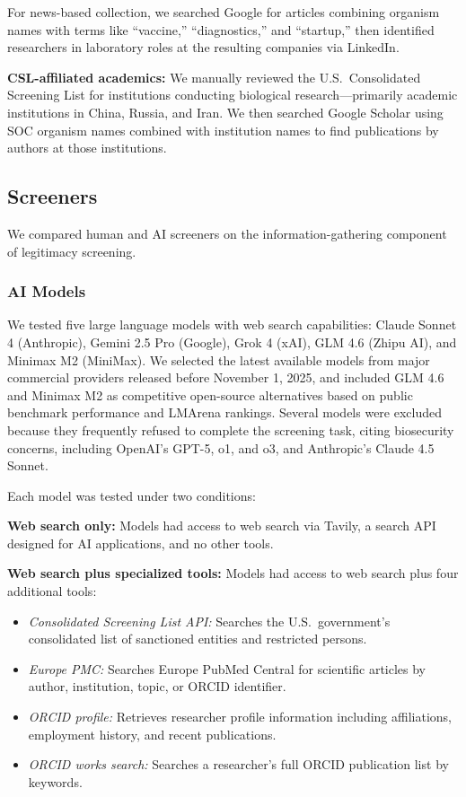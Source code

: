 \documentclass[utf8]{FrontiersinHarvard}
\begin{document}
For news-based collection, we searched Google for articles combining organism names with terms like ``vaccine,'' ``diagnostics,'' and ``startup,'' then identified researchers in laboratory roles at the resulting companies via LinkedIn.

\textbf{CSL-affiliated academics:} We manually reviewed the U.S.\ Consolidated Screening List for institutions conducting biological research---primarily academic institutions in China, Russia, and Iran. We then searched Google Scholar using SOC organism names combined with institution names to find publications by authors at those institutions.

\subsection{Screeners}

We compared human and AI screeners on the information-gathering component of legitimacy screening.

\subsubsection{AI Models}

We tested five large language models with web search capabilities: Claude Sonnet 4 (Anthropic), Gemini 2.5 Pro (Google), Grok 4 (xAI), GLM 4.6 (Zhipu AI), and Minimax M2 (MiniMax). We selected the latest available models from major commercial providers released before November 1, 2025, and included GLM 4.6 and Minimax M2 as competitive open-source alternatives based on public benchmark performance and LMArena rankings. Several models were excluded because they frequently refused to complete the screening task, citing biosecurity concerns, including OpenAI's GPT-5, o1, and o3, and Anthropic's Claude 4.5 Sonnet.

Each model was tested under two conditions:

\textbf{Web search only:} Models had access to web search via Tavily, a search API designed for AI applications, and no other tools.

\textbf{Web search plus specialized tools:} Models had access to web search plus four additional tools:

\begin{itemize}
\item \textit{Consolidated Screening List API:} Searches the U.S.\ government's consolidated list of sanctioned entities and restricted persons.
\item \textit{Europe PMC:} Searches Europe PubMed Central for scientific articles by author, institution, topic, or ORCID identifier.
\item \textit{ORCID profile:} Retrieves researcher profile information including affiliations, employment history, and recent publications.
\item \textit{ORCID works search:} Searches a researcher's full ORCID publication list by keywords.
\end{itemize}
\end{document}
